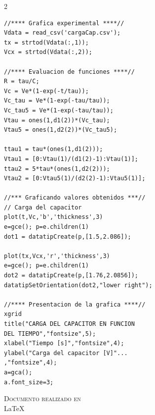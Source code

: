\documentclass[11pt,letterpaper]{article}
\begin{document}
\begin{multicols}{2}
\begin{verbatim}
//**** Grafica experimental ****//
Vdata = read_csv('cargaCap.csv');
tx = strtod(Vdata(:,1));
Vcx = strtod(Vdata(:,2));

//**** Evaluacion de funciones ****//
R = tau/C;
Vc = Ve*(1-exp(-t/tau));
Vc_tau = Ve*(1-exp(-tau/tau));
Vc_tau5 = Ve*(1-exp(-tau/tau));
Vtau = ones(1,d1(2))*(Vc_tau);
Vtau5 = ones(1,d2(2))*(Vc_tau5);

ttau1 = tau*(ones(1,d1(2)));
Vtau1 = [0:Vtau(1)/(d1(2)-1):Vtau(1)];
ttau2 = 5*tau*(ones(1,d2(2)));
Vtau2 = [0:Vtau5(1)/(d2(2)-1):Vtau5(1)];

//*** Graficando valores obtenidos ***//
// Carga del capacitor
plot(t,Vc,'b','thickness',3)
e=gce(); p=e.children(1)
dot1 = datatipCreate(p,[1.5,2.086]);

plot(tx,Vcx,'r','thickness',3)
e=gce(); p=e.children(1)
dot2 = datatipCreate(p,[1.76,2.0856]);
datatipSetOrientation(dot2,"lower right");

//**** Presentacion de la grafica ****//
xgrid
title("CARGA DEL CAPACITOR EN FUNCION
DEL TIEMPO","fontsize",5);
xlabel("Tiempo [s]","fontsize",4);
ylabel("Carga del capacitor [V]"...
,"fontsize",4);
a=gca();
a.font_size=3;
\end{verbatim}
\begin{center}
\textsc{Documento realizado en}\\
\Large \LaTeX
\end{center}
\end{multicols}
\end{document}

